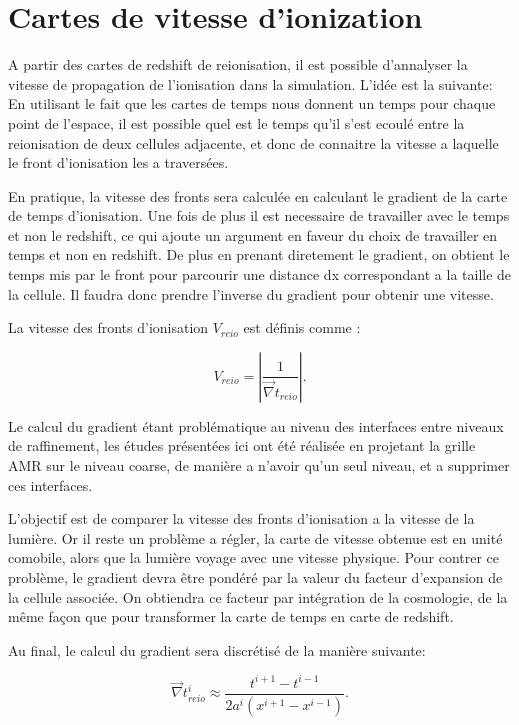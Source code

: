 \section{Cartes de vitesse d'ionization}

A partir des cartes de redshift de reionisation, il est possible d'annalyser la vitesse de propagation de l'ionisation dans la simulation.
L'idée est la suivante:
En utilisant le fait que les cartes de temps nous donnent un temps pour chaque point de l'espace, il est possible quel est le temps qu'il s'est ecoulé entre la reionisation de deux cellules adjacente, et donc de connaitre la vitesse a laquelle le front d'ionisation les a traversées.

En pratique, la vitesse des fronts sera calculée en calculant le gradient de la carte de temps d'ionisation.
Une fois de plus il est necessaire de travailler avec le temps et non le redshift, ce qui ajoute un argument en faveur du choix de travailler en temps et non en redshift.
De plus en prenant diretement le gradient, on obtient le temps mis par le front pour parcourir une distance dx correspondant a la taille de la cellule.
Il faudra donc prendre l'inverse du gradient pour obtenir une vitesse.

La vitesse des fronts d'ionisation $V_{reio}$ est définis comme :

\begin{equation}
V_{reio}  = \left | \frac{1}{ \vec{\nabla} t_{reio}} \right| .
\end{equation}


Le calcul du gradient étant problématique au niveau des interfaces entre niveaux de raffinement, les études présentées ici ont été réalisée en projetant la grille \ac{AMR} sur le niveau coarse, de manière a n'avoir qu'un seul niveau, et a supprimer ces interfaces.

L'objectif est de comparer la vitesse des fronts d'ionisation a la vitesse de la lumière.
Or il reste un problème a régler, la carte de vitesse obtenue est en unité comobile, alors que la lumière voyage avec une vitesse physique.
Pour contrer ce problème, le gradient devra être pondéré par la valeur du facteur d'expansion de la cellule associée.
On obtiendra ce facteur par intégration de la cosmologie, de la même façon que pour transformer la carte de temps en carte de redshift.

Au final, le calcul du gradient sera discrétisé de la manière suivante:

\begin{equation}
\vec{\nabla} t_{reio}^i \approx \frac{t^{i+1}  - t^{i-1}}{2a^i \left( x^{i+1}  - x^{i-1} \right)}.
\end{equation}

